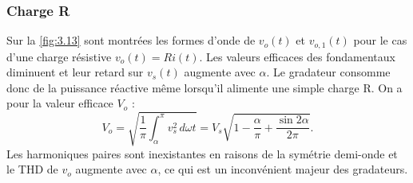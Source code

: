 			\subsubsection{Charge R}
				Sur la \autoref{fig:3.13} sont montrées les formes d'onde de $v_o(t)$ et $v_{o,1}(t)$ pour le cas d'une charge résistive $v_o(t) = Ri(t)$. Les valeurs efficaces des fondamentaux diminuent et leur retard sur $v_s(t)$ augmente avec $\alpha$. Le gradateur consomme donc de la puissance réactive même lorsqu'il alimente une simple charge R. On a pour la valeur efficace $V_o$ :
				\begin{equation}
					V_o = \sqrt{\frac{1}{\pi}\int _\alpha ^\pi v_s^2 \, d\omega t} = V_s \sqrt{1- \frac{\alpha}{\pi} + \frac{\sin 2\alpha}{2\pi}}. 
				\end{equation}
				Les harmoniques paires sont inexistantes en raisons de la symétrie demi-onde et le THD de $v_o$ augmente avec $\alpha$, ce qui est un inconvénient majeur des gradateurs. 
	
